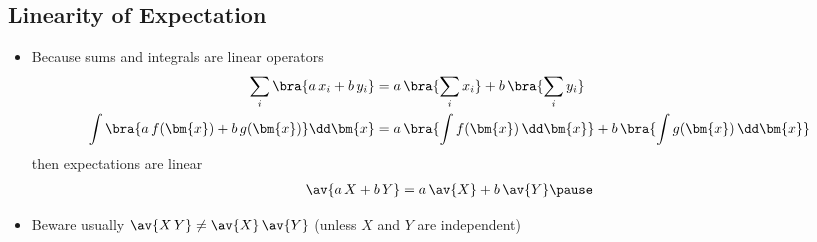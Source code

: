 \begin{slide}
\section[-2]{Linearity of Expectation}

\begin{PauseHighLight}
  \begin{itemize}
  \item Because sums and integrals are linear operators
    \begin{align*}
      \sum_i \bra{a\,x_i + b\,y_i}
      &= a\,\bra{ \sum_i  x_i} +  b\,\bra{\sum_i y_i} \\
      \int \bra{a\,f(\bm{x}) + b\, g(\bm{x})} \dd \bm{x}
      &=a \, \bra{ \int f(\bm{x})\, \dd \bm{x}} + b \,  \bra{ \int g(\bm{x})\, \dd \bm{x}}
    \end{align*}
    then expectations are linear
    \begin{align*}
      \av{a\,X + b\,Y} = a\,\av{X} + b\, \av{Y}\pause
    \end{align*}
  \item Beware usually $\av{X\,Y}\neq \av{X}\,\av{Y}$ (unless $X$ and
    $Y$ are independent)\pause
  \end{itemize}
\end{PauseHighLight}

\end{slide}


